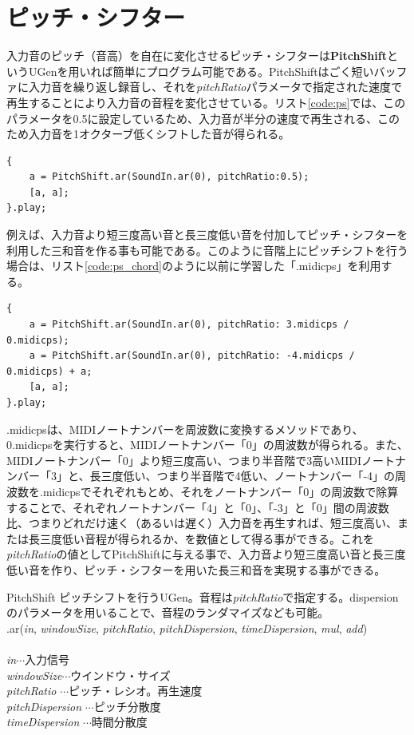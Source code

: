 \documentclass{jsarticle}
\begin{document}
\section{ピッチ・シフター}
入力音のピッチ（音高）を自在に変化させるピッチ・シフターは{\bf PitchShift}というUGenを用いれば簡単にプログラム可能である。PitchShiftはごく短いバッファに入力音を繰り返し録音し、それを{\it pitchRatio}パラメータで指定された速度で再生することにより入力音の音程を変化させている。リスト\ref{code:ps}では、このパラメータを0.5に設定しているため、入力音が半分の速度で再生される、このため入力音を1オクターブ低くシフトした音が得られる。

\begin{lstlisting}[caption=ピッチ・シフター, label=code:ps]
{
	a = PitchShift.ar(SoundIn.ar(0), pitchRatio:0.5);
	[a, a];
}.play;
\end{lstlisting}

例えば、入力音より短三度高い音と長三度低い音を付加してピッチ・シフターを利用した三和音を作る事も可能である。このように音階上にピッチシフトを行う場合は、リスト\ref{code:ps_chord}のように以前に学習した「.midicps」を利用する。

\begin{lstlisting}[caption=ピッチ・シフターによる和音, label=code:ps_chord]
{
	a = PitchShift.ar(SoundIn.ar(0), pitchRatio: 3.midicps / 0.midicps);
	a = PitchShift.ar(SoundIn.ar(0), pitchRatio: -4.midicps / 0.midicps) + a;
	[a, a];
}.play;
\end{lstlisting}

.midicpsは、MIDIノートナンバーを周波数に変換するメソッドであり、0.midicpsを実行すると、MIDIノートナンバー「0」の周波数が得られる。また、MIDIノートナンバー「0」より短三度高い、つまり半音階で3高いMIDIノートナンバー「3」と、長三度低い、つまり半音階で4低い、ノートナンバー「-4」の周波数を.midicpsでそれぞれもとめ、それをノートナンバー「0」の周波数で除算することで、それぞれノートナンバー「4」と「0」、「-3」と「0」間の周波数比、つまりどれだけ速く（あるいは遅く）入力音を再生すれば、短三度高い、または長三度低い音程が得られるか、を数値として得る事ができる。これを{\it pitchRatio}の値としてPitchShiftに与える事で、入力音より短三度高い音と長三度低い音を作り、ピッチ・シフターを用いた長三和音を実現する事ができる。

\begin{itembox}[l]{PitchShift}
{\footnotesize 
ピッチシフトを行うUGen。音程は{\it pitchRatio}で指定する。dispersionのパラメータを用いることで、音程のランダマイズなども可能。\\
.ar({\it in}, {\it windowSize}, {\it pitchRatio}, {\it pitchDispersion}, {\it timeDispersion}, {\it mul}, {\it add})\\\\
{\it in}$\cdots$入力信号\\
{\it windowSize}$\cdots$ウインドウ・サイズ\\
{\it pitchRatio} $\cdots$ピッチ・レシオ。再生速度\\
{\it pitchDispersion} $\cdots$ピッチ分散度\\
{\it timeDispersion} $\cdots$時間分散度\\
}
\end{itembox}
\end{document}
